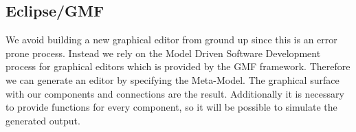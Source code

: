 	  \subsection{Eclipse/GMF}
		We avoid building a new graphical editor from ground up since this is an error prone process. Instead we rely on the Model Driven Software Development process for graphical editors which is provided by the GMF framework. Therefore we can generate an editor by specifying the Meta-Model. The graphical surface with our components and connections are the result. Additionally it is necessary to provide functions for every component, so it will be possible to simulate the generated output.      